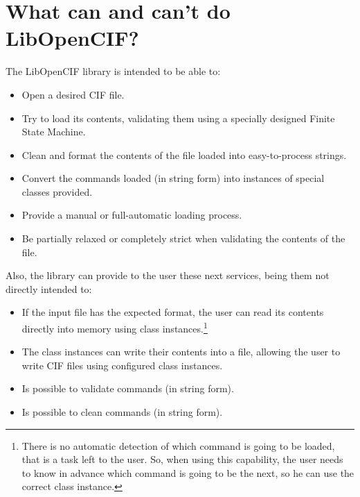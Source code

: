 \documentclass[11pt,twoside,openany,x11names,svgnames]{memoir}
\begin{document}
\section{What can and can't do LibOpenCIF?}\label{What-can-and-cant-do-LibOpenCIF}

The LibOpenCIF library is intended to be able to:

\begin{itemize}
	\item Open a desired CIF file.
	
	\item Try to load its contents, validating them using a specially designed Finite State Machine.
	
	\item Clean and format the contents of the file loaded into easy-to-process strings.
	
	\item Convert the commands loaded (in string form) into instances of special classes provided.
	
	\item Provide a manual or full-automatic loading process.
	
	\item Be partially relaxed or completely strict when validating the contents of the file.
\end{itemize}

Also, the library can provide to the user these next services, being them not directly intended to:

\begin{itemize}
	\item If the input file has the expected format, the user can read its contents directly into memory using class instances.\footnote{There is no automatic detection of which command is going to be loaded, that is a task left to the user. So, when using this capability, the user needs to know in advance which command is going to be the next, so he can use the correct class instance.}
	\item The class instances can write their contents into a file, allowing the user to write CIF files using configured class instances.
	\item Is possible to validate commands (in string form).
	\item Is possible to clean commands (in string form).
\end{itemize}
\end{document}
